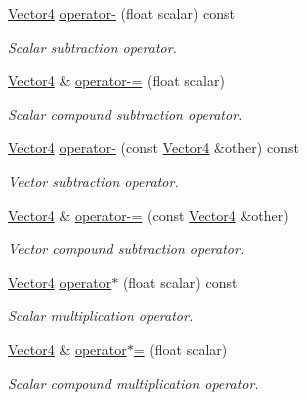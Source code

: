 \begin{DoxyCompactItemize}
\hyperlink{classchaos_1_1gfx_1_1_vector4}{Vector4} \hyperlink{classchaos_1_1gfx_1_1_vector4_af4f001e9cb65320da1831cebcab8d859}{operator-\/} (float scalar) const 
\begin{DoxyCompactList}\small\item\em Scalar subtraction operator. \end{DoxyCompactList}\item 
\hyperlink{classchaos_1_1gfx_1_1_vector4}{Vector4} \& \hyperlink{classchaos_1_1gfx_1_1_vector4_a0d6a6c74179d2b8963b6c1bedd83bf5e}{operator-\/=} (float scalar)
\begin{DoxyCompactList}\small\item\em Scalar compound subtraction operator. \end{DoxyCompactList}\item 
\hyperlink{classchaos_1_1gfx_1_1_vector4}{Vector4} \hyperlink{classchaos_1_1gfx_1_1_vector4_af923be6632e670c30a3e86683b47d903}{operator-\/} (const \hyperlink{classchaos_1_1gfx_1_1_vector4}{Vector4} \&other) const 
\begin{DoxyCompactList}\small\item\em Vector subtraction operator. \end{DoxyCompactList}\item 
\hyperlink{classchaos_1_1gfx_1_1_vector4}{Vector4} \& \hyperlink{classchaos_1_1gfx_1_1_vector4_aba6caefa7d369b2019347462999802ea}{operator-\/=} (const \hyperlink{classchaos_1_1gfx_1_1_vector4}{Vector4} \&other)
\begin{DoxyCompactList}\small\item\em Vector compound subtraction operator. \end{DoxyCompactList}\item 
\hyperlink{classchaos_1_1gfx_1_1_vector4}{Vector4} \hyperlink{classchaos_1_1gfx_1_1_vector4_afee77ed144ba58fae3877ddbebcd75d3}{operator$\ast$} (float scalar) const 
\begin{DoxyCompactList}\small\item\em Scalar multiplication operator. \end{DoxyCompactList}\item 
\hyperlink{classchaos_1_1gfx_1_1_vector4}{Vector4} \& \hyperlink{classchaos_1_1gfx_1_1_vector4_ae171d478578a7a1564ca3e869da3b3f8}{operator$\ast$=} (float scalar)
\begin{DoxyCompactList}\small\item\em Scalar compound multiplication operator. \end{DoxyCompactList}\item 

\end{DoxyCompactItemize}
